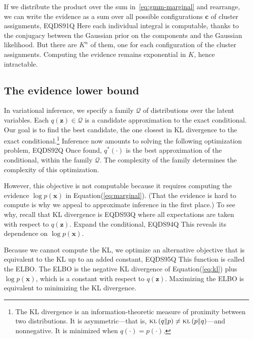 \documentclass{article}
\begin{document}
If we distribute the product over the sum in~\eqref{eq:gmm-marginal} and
rearrange, we can write the evidence as a sum over all possible
configurations ${\mathbf{c}}$ of cluster assignments,
EQDS91Q
Here each individual integral is computable, thanks to the conjugacy
between the Gaussian prior on the components and the Gaussian
likelihood. But there are $K^n$ of them, one for each configuration of
the cluster assignments. Computing the evidence remains
exponential in $K$, hence intractable.

\subsection{The evidence lower bound}
\label{sec:elbo}

In variational inference, we specify a family $\mathcal{Q}$ of
distributions over the latent variables. Each $q({\mathbf{z}}) \in \mathcal{Q}$
is a candidate approximation to the exact conditional. Our goal is to
find the best candidate, the one closest in \gls{KL} divergence to the
exact conditional.\footnote{ The \gls{KL} divergence is an
  information-theoretic measure of proximity between two
  distributions. It is asymmetric---that is,
  ${\textsc{kl}\left({q \| p}\right)} \neq {\textsc{kl}\left({p \| q}\right)}$---and nonnegative. It is minimized
  when $q(\cdot) = p(\cdot)$.}  Inference now amounts to solving the
following optimization problem,
EQDS92Q
Once found, $q^*(\cdot)$ is the best approximation of the conditional,
within the family ${\mathcal{Q}}$.  The complexity of the family determines the
complexity of this optimization.

However, this objective is not computable because it requires
computing the evidence $\log p({\mathbf{x}})$ in Equation\nobreakspace \textup {(\ref {eq:marginal})}.  (That the
evidence is hard to compute is why we appeal to approximate inference
in the first place.) To see why, recall that \gls{KL} divergence is
EQDS93Q
where all expectations are taken with respect to $q({\mathbf{z}})$.  Expand the
conditional,
EQDS94Q
This reveals its dependence on $\log p({\mathbf{x}})$.

Because we cannot compute the \gls{KL}, we optimize an alternative
objective that is equivalent to the \gls{KL} up to an added constant,
EQDS95Q
This function is called the \gls{ELBO}.  The \gls{ELBO} is the
negative \gls{KL} divergence of Equation\nobreakspace \textup {(\ref {eq:kl})} plus $\log p({\mathbf{x}})$, which
is a constant with respect to $q({\mathbf{z}})$.  Maximizing the \gls{ELBO} is
equivalent to minimizing the \gls{KL} divergence.
\end{document}
